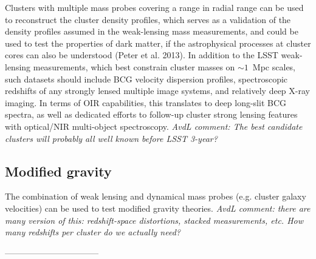 Clusters with multiple mass probes covering a range in radial range can be used to reconstruct the cluster density profiles, which serves as a validation of the density profiles assumed in the weak-lensing mass measurements, and could be used to test the properties of dark matter, if the astrophysical processes at cluster cores can also be understood (Peter et al. 2013).  In addition to the LSST weak-lensing measurements, which best constrain cluster masses on $\sim1$~Mpc scales, such datasets should include BCG velocity dispersion profiles, spectroscopic redshifts of any strongly lensed multiple image systems, and relatively deep X-ray imaging. In terms of OIR capabilities, this translates to deep long-slit BCG spectra, as well as dedicated efforts to follow-up cluster strong lensing features with optical/NIR multi-object spectroscopy.  {\it AvdL comment: The best candidate clusters will probably all well known before LSST 3-year?}

\subsection{Modified gravity}

The combination of weak lensing and dynamical mass probes (e.g. cluster galaxy velocities) can be used to test modified gravity theories.  {\it AvdL comment: there are many version of this: redshift-space distortions, stacked measurements, etc.  How many redshifts per cluster do we actually need?}

---------------------------------

